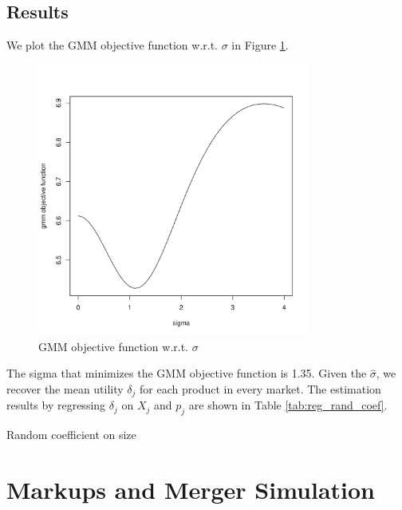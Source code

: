 \documentclass[12pt]{article}[margin=1in]
\begin{document}
\subsection{Results}
We plot the GMM objective function w.r.t. $\sigma$ in Figure
\ref{fig:iv_local_diff}.

\begin{figure}[h!]
    \centering
    \includegraphics[width=0.8\textwidth]{../Results/Figures/gmm_obj_iv_instr.pdf}
    \caption{GMM objective function w.r.t. $\sigma$}
    \label{fig:iv_local_diff}
\end{figure}

The sigma that minimizes the GMM objective function is 1.35. Given the
$\hat{\sigma}$, we recover the mean utility $\delta_j$ for each product in
every market. The estimation results by regressing $\delta_j$ on $X_j$ and
$p_j$ are shown in Table \ref{tab:reg_rand_coef}.

\begin{table}[h!]
    \fontsize{10pt}{12pt}\selectfont
    \centering
    
    \caption{Random coefficient on size}
    \label{tab:reg_rand_coef}
\end{table}

\section{Markups and Merger Simulation}
\end{document}
